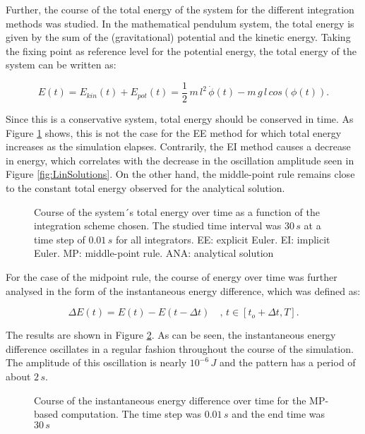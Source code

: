 \documentclass[12pt,bibstyle=none,pagenumberinfooter]{ifmdocument}
\begin{document}
Further, the course of the total energy of the system for the different integration methods was studied. In the mathematical pendulum system, the total energy is given by the sum of the (gravitational) potential and the kinetic energy. Taking the fixing point as reference level for the potential energy, the total energy of the system can be written as:

\begin{equation}
    E(t) = E_{kin}(t) + E_{pot}(t) = \frac{1}{2}\,m\,l^2\,\Dot{\phi}(t) - m\,g\,l\,cos\left(\phi(t)\right).
    \label{eq: energy}
\end{equation}

Since this is a conservative system, total energy should be conserved in time. As Figure \ref{fig: EnergyPlot} shows, this is not the case for the EE method for which total energy increases as the simulation elapses. Contrarily, the EI method causes a decrease in energy, which correlates with the decrease in the oscillation amplitude seen in Figure \ref{fig:LinSolutions}. On the other hand, the middle-point rule remains close to the constant total energy observed for the analytical solution.

\begin{figure}[h]
    \centering
    \setlength{\figH}{0.3\textheight}
    \setlength{\figW}{0.6\textwidth}
    
    \caption{Course of the system´s total energy over time as a function of the integration scheme chosen. The studied time interval was $30\,s$ at a time step of $0.01\,s$ for all integrators. EE: explicit Euler. EI: implicit Euler. MP: middle-point rule. ANA: analytical solution}
    \label{fig: EnergyPlot}
\end{figure}

For the case of the midpoint rule, the course of energy over time was further analysed in the form of the instantaneous energy difference, which was defined as:

\begin{equation}
    \Delta E (t) = E(t) - E(t-\Delta t) \quad ,\,t \in [t_o + \Delta t, T].
\end{equation}

The results are shown in Figure \ref{fig: EnergyDiffPlot}. As can be seen, the instantaneous energy difference oscillates in a regular fashion throughout the course of the simulation. The amplitude of this oscillation is nearly $10^{-6}\,J$ and the pattern has a period of about $2\,s$.

\begin{figure}[h]
    \centering
    \setlength{\figH}{0.3\textheight}
    \setlength{\figW}{0.6\textwidth}
    
    \caption{Course of the instantaneous energy difference over time for the MP-based computation. The time step was $0.01 \,s$ and the end time was $30\,s$}
    \label{fig: EnergyDiffPlot}
\end{figure}
\end{document}
